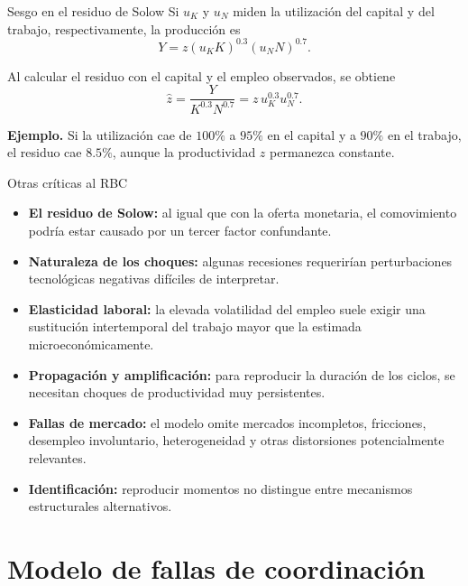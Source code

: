 \documentclass[aspectratio=169,11pt]{beamer}
\begin{document}
\begin{frame}{Sesgo en el residuo de Solow}
    Si \(u_K\) y \(u_N\) miden la utilización del capital y del trabajo,
    respectivamente, la producción es
    \[
        Y = z(u_K K)^{0.3}(u_N N)^{0.7}.
    \]

    Al calcular el residuo con el capital y el empleo observados,
    se obtiene
    \[
        \widehat z = \frac{Y}{K^{0.3}N^{0.7}}
        = z\,u_K^{0.3}u_N^{0.7}.
    \]

    \textbf{Ejemplo.} Si la utilización cae de \(100\%\) a \(95\%\) en
    el capital y a \(90\%\) en el trabajo, el residuo cae \(8.5\%\),
    aunque la productividad \(z\) permanezca constante.
\end{frame}


\begin{frame}{Otras críticas al RBC}
  \small
  \begin{itemize}
    \setlength{\itemsep}{0.58em}
    \item \textbf{El residuo de Solow:} al igual que con la oferta monetaria, el comovimiento podría estar causado por un tercer factor confundante.
    \item \textbf{Naturaleza de los choques:} algunas recesiones requerirían perturbaciones tecnológicas negativas difíciles de interpretar.
    \item \textbf{Elasticidad laboral:} la elevada volatilidad del empleo suele exigir una sustitución intertemporal del trabajo mayor que la estimada microeconómicamente.
    \item \textbf{Propagación y amplificación:} para reproducir la duración de los ciclos, se necesitan choques de productividad muy persistentes.
    \item \textbf{Fallas de mercado:} el modelo omite mercados incompletos, fricciones, desempleo involuntario, heterogeneidad y otras distorsiones potencialmente relevantes.
    \item \textbf{Identificación:} reproducir momentos no distingue entre mecanismos estructurales alternativos.
  \end{itemize}
\end{frame}


\section{Modelo de fallas de coordinación}
\end{document}
